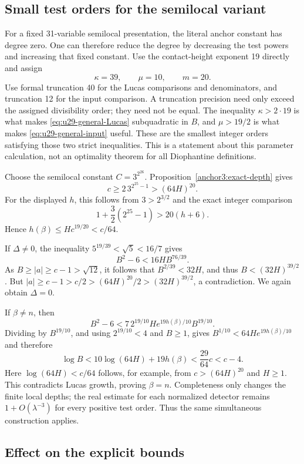 \documentclass[11pt,a4paper]{article}
\theoremstyle{definition}
\theoremstyle{remark}
\begin{document}
\subsection{Small test orders for the semilocal variant}

For a fixed 31-variable semilocal presentation, the literal anchor
constant has degree zero.  One can therefore reduce the degree by
decreasing the test powers and increasing that fixed constant.
Use the contact-height exponent 19 directly and assign
\[
                 \kappa=39,\qquad\mu=10,\qquad m=20.
\]
Use formal truncation 40 for the Lucas comparisons and denominators,
and truncation 12 for the input comparison.  A truncation precision
need only exceed the assigned divisibility order; they need not be
equal.  The inequality $\kappa>2\cdot19$ is what makes
\eqref{eq:u29-general-Lucas} subquadratic in $B$, and
$\mu>19/2$ is what makes \eqref{eq:u29-general-input} useful.
These are the smallest integer orders satisfying those two strict
inequalities.  This is a statement about this parameter calculation,
not an optimality theorem for all Diophantine definitions.

Choose the semilocal constant $C=3^{2^{26}}$.  Proposition~\ref{anchor3:exact-depth}
gives
\[
 c\ge2\,3^{2^{25}-1}>(64H)^{20}.
\]
For the displayed $h$, this follows from $3>2^{3/2}$ and the exact
integer comparison
\[
 1+\frac32(2^{25}-1)>20(h+6).
\]
Hence $h(\beta)\le Hc^{19/20}<c/64$.

If $\Delta\ne0$, the inequality $5^{19/39}<\sqrt5<16/7$ gives
\[
 B^2-6<16HB^{76/39}.
\]
As $B\ge|a|\ge c-1>\sqrt{12}$, it follows that
$B^{2/39}<32H$, and thus $B<(32H)^{39/2}$.
But $|a|\ge c-1>c/2>(64H)^{20}/2>(32H)^{39/2}$,
a contradiction.  We again obtain $\Delta=0$.

If $\beta\ne n$, then
\[
 B^2-6<7\,2^{19/10}He^{19h(\beta)/10}B^{19/10}.
\]
Dividing by $B^{19/10}$, and using $2^{19/10}<4$ and $B\ge1$,
gives $B^{1/10}<64He^{19h(\beta)/10}$ and therefore
\[
 \log B<10\log(64H)+19h(\beta)<\frac{29}{64}c<c-4.
\]
Here $\log(64H)<c/64$ follows, for example, from
$c>(64H)^{20}$ and $H\ge1$.
This contradicts Lucas growth, proving $\beta=n$.
Completeness only changes the finite local depths; the real estimate
for each normalized detector remains $1+O(\lambda^{-3})$ for every
positive test order.  Thus the same simultaneous construction applies.

\subsection{Effect on the explicit bounds}
\end{document}
